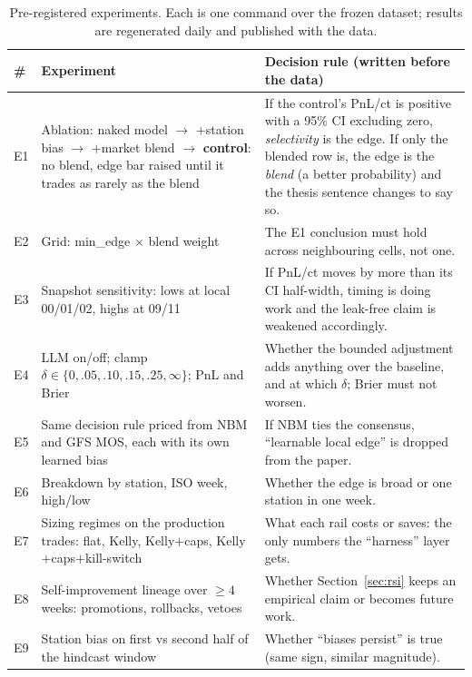 \documentclass[sigconf,review,anonymous]{acmart}
\begin{document}
\begin{table}[t]
\centering
\small
\begin{tabular}{@{}p{0.5cm}p{7.6cm}p{8.4cm}@{}}
\toprule
\# & \textbf{Experiment} & \textbf{Decision rule (written before the data)} \\
\midrule
E1 & Ablation: naked model $\to$ $+$station bias $\to$ $+$market blend $\to$ \textbf{control}: no blend, edge bar raised until it trades as rarely as the blend & If the control's PnL/ct is positive with a 95\% CI excluding zero, \emph{selectivity} is the edge. If only the blended row is, the edge is the \emph{blend} (a better probability) and the thesis sentence changes to say so. \\
E2 & Grid: min\_edge $\times$ blend weight & The E1 conclusion must hold across neighbouring cells, not one. \\
E3 & Snapshot sensitivity: lows at local 00/01/02, highs at 09/11 & If PnL/ct moves by more than its CI half-width, timing is doing work and the leak-free claim is weakened accordingly. \\
E4 & LLM on/off; clamp $\delta\in\{0,.05,.10,.15,.25,\infty\}$; PnL and Brier & Whether the bounded adjustment adds anything over the baseline, and at which $\delta$; Brier must not worsen. \\
E5 & Same decision rule priced from NBM and GFS MOS, each with its own learned bias & If NBM ties the consensus, ``learnable local edge'' is dropped from the paper. \\
E6 & Breakdown by station, ISO week, high/low & Whether the edge is broad or one station in one week. \\
E7 & Sizing regimes on the production trades: flat, Kelly, Kelly$+$caps, Kelly$+$caps$+$kill-switch & What each rail costs or saves: the only numbers the ``harness'' layer gets. \\
E8 & Self-improvement lineage over $\geq 4$ weeks: promotions, rollbacks, vetoes & Whether Section~\ref{sec:rsi} keeps an empirical claim or becomes future work. \\
E9 & Station bias on first vs second half of the hindcast window & Whether ``biases persist'' is true (same sign, similar magnitude). \\
\bottomrule
\end{tabular}
\caption{Pre-registered experiments. Each is one command over the frozen
dataset; results are regenerated daily and published with the data.}
\label{tab:prereg}
\end{table}
\end{document}
